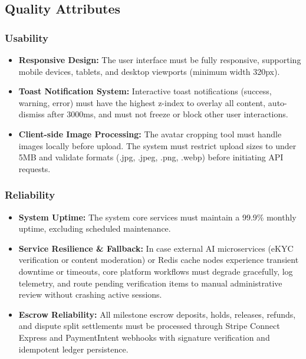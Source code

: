 \subsection{Quality Attributes}

\subsubsection{Usability}
\begin{itemize}
    \item \textbf{Responsive Design:} The user interface must be fully responsive, supporting mobile devices, tablets, and desktop viewports (minimum width 320px).
    \item \textbf{Toast Notification System:} Interactive toast notifications (success, warning, error) must have the highest z-index to overlay all content, auto-dismiss after 3000ms, and must not freeze or block other user interactions.
    \item \textbf{Client-side Image Processing:} The avatar cropping tool must handle images locally before upload. The system must restrict upload sizes to under 5MB and validate formats (.jpg, .jpeg, .png, .webp) before initiating API requests.
\end{itemize}

\subsubsection{Reliability}
\begin{itemize}
    \item \textbf{System Uptime:} The system core services must maintain a 99.9\% monthly uptime, excluding scheduled maintenance.
    \item \textbf{Service Resilience \& Fallback:} In case external AI microservices (eKYC verification or content moderation) or Redis cache nodes experience transient downtime or timeouts, core platform workflows must degrade gracefully, log telemetry, and route pending verification items to manual administrative review without crashing active sessions.
    \item \textbf{Escrow Reliability:} All milestone escrow deposits, holds, releases, refunds, and dispute split settlements must be processed through Stripe Connect Express and PaymentIntent webhooks with signature verification and idempotent ledger persistence.
\end{itemize}

